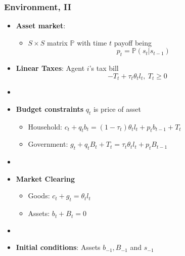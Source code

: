 \documentclass{beamer}
\begin{document}
\begin{frame}
 \frametitle{Environment, II}
 \begin{itemize}
\item \textbf{Asset market}:
\begin{itemize}
\item $S \times S$ matrix $\mathbb{P}$ with time $t$ payoff being
\[p_t=\mathbb{P}(s_{t}|s_{t-1})\]
\end{itemize}



  \item \textbf{Linear Taxes}: Agent $i$'s tax bill
\[- T_t + \tau_t \theta_{t}l_{t},  \ T_t \geq 0 \]

\item[]
  \item \textbf{Budget constraints} $q_t$ is price of  asset

  \begin{itemize}
   \item Household: $ c_{t}+q_tb_{t}=\left( 1-\tau _{t}\right) \theta _{t}l_{t}+p_{t}b_{t-1}+T_{t}$ %
  \item Government: $g_{t}+q_tB_{t}+T_t=\tau _{t}\theta_{t}l_{t}+p_{t}B_{t-1} $%
  \end{itemize}

\item[]
  \item \textbf{Market Clearing}
  \begin{itemize}
   \item Goods: $c_{t}+g_t = \theta _{t} l_{t}$

   \item Assets: $b_{t}+B_{t}=0$
\end{itemize}
  \item[]

\item \textbf{Initial conditions}: Assets $b_{-1}, B_{-1}$ and  $s_{-1}$
\end{itemize}

\end{frame}
\end{document}
